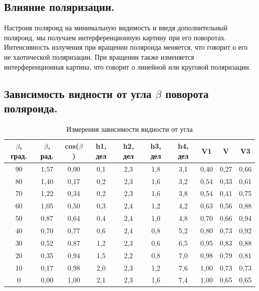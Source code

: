 \documentclass[a4paper,12pt]{article}
\begin{document}
\subsection{Влияние поляризации.}

Настроив поляроид на минимальную видимость и введя дополнительный поляроид, мы получаем интерференционную картину при его поворотах. Интенсивность излучения при вращении поляроида меняется, что говорит о его не хаотической поляризации. При вращении также изменяется интерференционная картина, что говорит о линейной или круговой поляризации.



\subsection{Зависимость видности от угла $\beta$ поворота поляроида.}



\begin{table}[h!]
\centering
\begin{tabular}{|c|c|c|c|c|c|c|c|c|c|}
\hline
$\beta$, град. & $\beta$, рад. & cos($\beta$) & h1, дел & h2, дел & h3, дел & h4, дел & V1   & V    & V3   \\ \hline
90       & 1,57    & 0,00   & 0,1     & 2,3     & 1,8     & 3,1     & 0,40 & 0,27 & 0,66 \\ \hline
80       & 1,40    & 0,17   & 0,2     & 2,3     & 1,6     & 3,2     & 0,54 & 0,33 & 0,61 \\ \hline
70       & 1,22    & 0,34   & 0,2     & 2,3     & 1,6     & 3,8     & 0,54 & 0,41 & 0,75 \\ \hline
60       & 1,05    & 0,50   & 0,3     & 2,4     & 1,2     & 4,2     & 0,63 & 0,56 & 0,88 \\ \hline
50       & 0,87    & 0,64   & 0,4     & 2,4     & 1,0     & 4,8     & 0,70 & 0,66 & 0,94 \\ \hline
40       & 0,70    & 0,77   & 0,6     & 2,4     & 0,8     & 5,2     & 0,80 & 0,73 & 0,92 \\ \hline
30       & 0,52    & 0,87   & 1,2     & 2,3     & 0,6     & 6,5     & 0,95 & 0,83 & 0,88 \\ \hline
20       & 0,35    & 0,94   & 1,5     & 2,2     & 0,8     & 7,0     & 0,98 & 0,79 & 0,81 \\ \hline
10       & 0,17    & 0,98   & 2,0     & 2,3     & 1,2     & 7,6     & 1,00 & 0,73 & 0,73 \\ \hline
0        & 0,00    & 1,00   & 2,1     & 2,3     & 1,6     & 7,4     & 1,00 & 0,65 & 0,65 \\ \hline
\end{tabular}
    \centering
    \label{table_v3}
        \caption{Измерения зависимости видности от угла}

\end{table}
\end{document}
